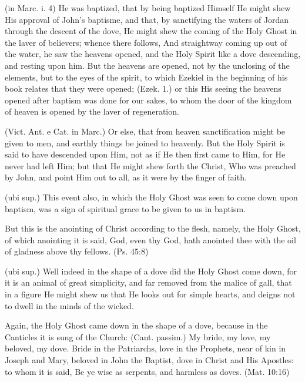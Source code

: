  (in Marc. i. 4) He was baptized, that by being baptized Himself He might shew His approval of John’s baptisme, and that, by sanctifying the waters of Jordan through the descent of the dove, He might shew the coming of the Holy Ghost in the laver of believers; whence there follows, And straightway coming up out of the water, he saw the heavens opened, and the Holy Spirit like a dove descending, and resting upon him. But the heavens are opened, not by the unclosing of the elements, but to the eyes of the spirit, to which Ezekiel in the beginning of his book relates that they were opened; (Ezek. 1.) or this His seeing the heavens opened after baptism was done for our sakes, to whom the door of the kingdom of heaven is opened by the laver of regeneration.

 (Vict. Ant. e Cat. in Marc.) Or else, that from heaven sanctification might be given to men, and earthly things be joined to heavenly. But the Holy Spirit is said to have descended upon Him, not as if He then first came to Him, for He never had left Him; but that He might shew forth the Christ, Who was preached by John, and point Him out to all, as it were by the finger of faith.

 (ubi sup.) This event also, in which the Holy Ghost was seen to come down upon baptism, was a sign of spiritual grace to be given to us in baptism.

 But this is the anointing of Christ according to the flesh, namely, the Holy Ghost, of which anointing it is said, God, even thy God, hath anointed thee with the oil of gladness above thy fellows. (Ps. 45:8)

 (ubi sup.) Well indeed in the shape of a dove did the Holy Ghost come down, for it is an animal of great simplicity, and far removed from the malice of gall, that in a figure He might shew us that He looks out for simple hearts, and deigns not to dwell in the minds of the wicked.

 Again, the Holy Ghost came down in the shape of a dove, because in the Canticles it is sung of the Church: (Cant. passim.) My bride, my love, my beloved, my dove. Bride in the Patriarchs, love in the Prophets, near of kin in Joseph and Mary, beloved in John the Baptist, dove in Christ and His Apostles: to whom it is said, Be ye wise as serpents, and harmless as doves. (Mat. 10:16)

